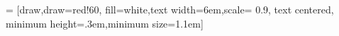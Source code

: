  = [draw,draw=red!60, fill=white,text width=6em,scale= 0.9, text centered, minimum height=.3em,minimum size=1.1em]

\usepackage{textcomp}
\usepackage{gensymb} %
\usepackage{float}
\usepackage{stfloats}
\usepackage{wrapfig}
\usepackage{bm}
  \setcounter{MaxMatrixCols}{30} %
\usepackage{tabularx}

\usepackage{lineno}
